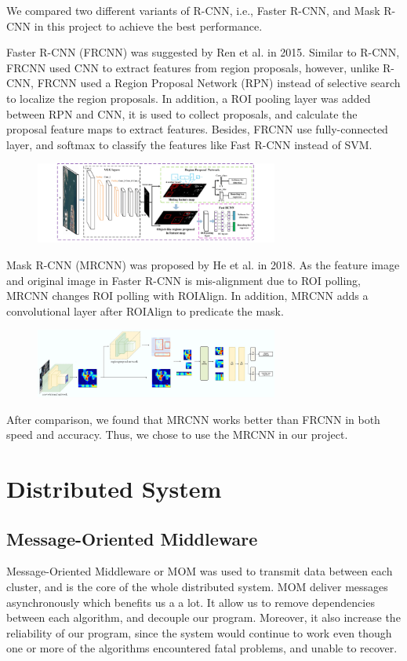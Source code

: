 \documentclass[runningheads]{llncs}
\begin{document}
We compared two different variants of R-CNN, i.e., 
Faster R-CNN, and Mask R-CNN in this project to achieve the 
best performance. 

Faster R-CNN\cite{FasterRCNN} (FRCNN) was suggested by Ren 
et al. in 2015. Similar to R-CNN, FRCNN used CNN to 
extract features from region proposals, however, unlike 
R-CNN, FRCNN used a Region Proposal Network (RPN) instead 
of selective search to localize the region proposals. In 
addition, a ROI pooling layer was added between RPN and 
CNN, it is used to collect proposals, and calculate the 
proposal feature maps to extract features. Besides, FRCNN 
use fully-connected layer, and softmax to classify the 
features like Fast R-CNN instead of SVM. 
\begin{figure}
    \centering
    \includegraphics[width=8cm]{reference/frcnn}
    \label{fig:example}
\end{figure}
Mask R-CNN\cite{MaskRCNN} (MRCNN) was proposed by He et al. 
in 2018. As the feature image and original image in Faster 
R-CNN is mis-alignment due to ROI polling, MRCNN changes ROI 
polling with ROIAlign. In addition, MRCNN adds a 
convolutional layer after ROIAlign to predicate the mask. 
\begin{figure}
    \centering
    \includegraphics[width=8cm]{reference/mrcnn}
    \label{fig:example}
\end{figure}
After comparison, we found that MRCNN works better than 
FRCNN in both speed and accuracy. Thus, we chose to use the 
MRCNN in our project. 


\section{Distributed System}

\subsection{Message-Oriented Middleware}
Message-Oriented Middleware or MOM was used to transmit 
data between each cluster, and is the core of the whole 
distributed system. MOM deliver messages asynchronously 
which benefits us a a lot. It allow us to remove 
dependencies between each algorithm, and decouple our 
program. Moreover, it also increase the reliability of our 
program, since the system would continue to work even 
though one or more of the algorithms encountered fatal 
problems, and unable to recover.
\end{document}
